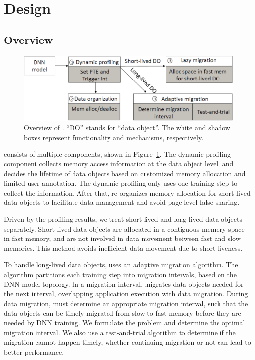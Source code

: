 \section{Design}
\subsection{Overview}
\begin{figure}[t!]
	\centering
	\includegraphics[height=0.11\textheight]{./figures/overview-2.pdf}
	\vspace{-5pt}
	\caption{Overview of \name. ``DO'' stands for ``data object''.  The white and shadow boxes represent functionality and mechanisms, respectively.} 
	\vspace{-15pt}
	\centering
	\label{fig:overview} 
\end{figure}



\name consists  of multiple components, shown in Figure~\ref{fig:overview}. The dynamic profiling component collects memory access information at the data object level, and decides the lifetime of data objects based on  customized memory allocation
and limited user annotation. The dynamic profiling only uses one training step to collect the information. After that, \name re-organizes memory allocation for short-lived data objects to facilitate data management and avoid page-level false sharing.

Driven by the profiling results, we treat short-lived and long-lived data objects separately. Short-lived data objects are allocated in a contiguous memory space in fast memory, and are not involved in data movement between fast and slow memories. This method avoids inefficient data movement due to short liveness. 

To handle long-lived data objects, \name uses an adaptive migration algorithm. The algorithm partitions each training step into migration intervals, based on the DNN model topology. In a migration interval, \name migrates data objects needed for the next interval, overlapping application execution with data migration. During data migration, \name must determine an appropriate migration interval, such that the data objects can be timely migrated from slow to fast memory before they are needed by DNN training. We formulate the problem and determine the optimal migration interval. We also use a test-and-trial algorithm to determine if the migration cannot happen timely, whether continuing migration or not can lead to better performance. 


